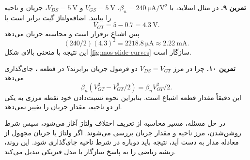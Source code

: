 \textbf{تمرین ۹.} در مثال اسلاید، با \(\beta_n=\qty{240}{\micro\ampere\per\volt\squared}\)،
\(V_{GS}=\qty{5}{\volt}\) و \(V_{DS}=\qty{5}{\volt}\)، جریان و ناحیه را بیابید.
اضافه‌ولتاژ گیت برابر است با
\[
 V_{GT}=5-0.7=\qty{4.3}{\volt}.
\]
پس اشباع برقرار است و محاسبه جریان می‌دهد
\[
 (240/2)(4.3)^2=\qty{2218.8}{\micro\ampere}\approx\qty{2.22}{\milli\ampere}.
\]
این نتیجه با منحنی بالای شکل \ref{fig:mos-slide-curves} سازگار است.

\textbf{تمرین ۱۰.} چرا در مرز \(V_{DS}=V_{GT}\) دو فرمول جریان برابرند؟
در قطعه ، جای‌گذاری می‌دهد
\[
 \beta_n(V_{GT}^2-V_{GT}^2/2)=\beta_nV_{GT}^2/2.
\]
این دقیقاً مقدار قطعه اشباع است. بنابراین نحوه نسبت‌دادن خود نقطه مرزی به یکی
از دو ناحیه، مقدار جریان را تغییر نمی‌دهد.

در حل مسئله، مسیر محاسبه از تعریف اختلاف ولتاژ آغاز می‌شود، سپس شرط روشن‌شدن،
مرز ناحیه و مقدار جریان بررسی می‌شوند. اگر ولتاژ یا جریان مجهول از معادله مدار
به دست آید، نتیجه باید دوباره در شرط ناحیه جای‌گذاری شود.
این روند، ریشه ریاضی را به پاسخ سازگار با مدل فیزیکی تبدیل می‌کند.
\clearpage
